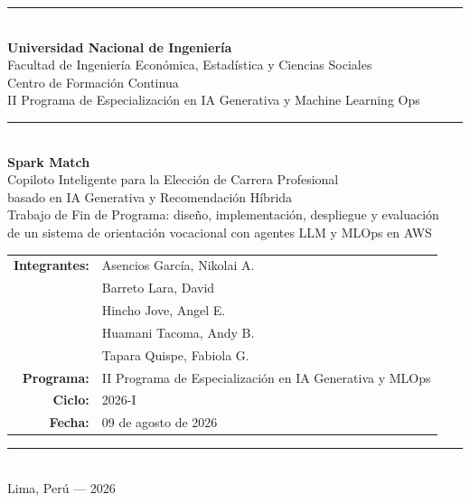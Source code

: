 




\begin{titlepage}
    \centering
    \vspace*{0.6cm}

    \rule{\linewidth}{0.5pt}\\[0.3cm]
    {\Large \textbf{Universidad Nacional de Ingenier\'ia}}\\[0.15cm]
    {\large Facultad de Ingenier\'ia Econ\'omica, Estad\'istica y Ciencias Sociales}\\[0.1cm]
    {\normalsize Centro de Formaci\'on Continua}\\[0.1cm]
    {\normalsize II Programa de Especializaci\'on en IA Generativa y Machine Learning Ops}\\
    \rule{\linewidth}{0.5pt}\\[1.1cm]

    {\LARGE \textbf{Spark Match}}\\[0.4cm]
    {\Large Copiloto Inteligente para la Elecci\'on de Carrera Profesional\\basado en IA Generativa y Recomendaci\'on H\'ibrida}\\[0.7cm]
    {\normalsize Trabajo de Fin de Programa: dise\~no, implementaci\'on, despliegue y evaluaci\'on\\
    de un sistema de orientaci\'on vocacional con agentes LLM y MLOps en AWS}\\[1.5cm]

    \begin{tabular}{rl}
        \textbf{Integrantes:}  & Asencios Garc\'ia, Nikolai A. \\
                               & Barreto Lara, David \\
                               & Hincho Jove, Angel E. \\
                               & Huamani Tacoma, Andy B. \\
                               & Tapara Quispe, Fabiola G. \\[0.25cm]

        \textbf{Programa:}     & II Programa de Especializaci\'on en IA Generativa y MLOps \\[0.25cm]
        \textbf{Ciclo:}        & 2026-I \\[0.25cm]
        \textbf{Fecha:}        & 09 de agosto de 2026 \\
    \end{tabular}

    \vfill

    \rule{\linewidth}{0.5pt}\\[0.2cm]
    {\small Lima, Per\'u --- 2026}
\end{titlepage}

